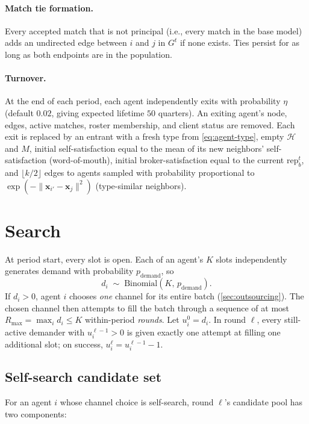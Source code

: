 \documentclass[11pt]{article}
\providecommand{\cref}[1]{\ref{#1}}
\newcommand{\x}{\mathbf{x}}
\newcommand{\Hist}{\mathcal{H}}
\newcommand{\rep}{\mathrm{rep}}
\begin{document}
\paragraph{Match tie formation.} Every accepted match that is not principal (i.e., every match in the base model) adds an undirected edge between $i$ and $j$ in $G^t$ if none exists. Ties persist for as long as both endpoints are in the population.

\paragraph{Turnover.} At the end of each period, each agent independently exits with probability $\eta$ (default $0.02$, giving expected lifetime $50$ quarters). An exiting agent's node, edges, active matches, roster membership, and client status are removed. Each exit is replaced by an entrant with a fresh type from \cref{eq:agent-type}, empty $\Hist$ and $M$, initial self-satisfaction equal to the mean of its new neighbors' self-satisfaction (word-of-mouth), initial broker-satisfaction equal to the current $\rep_b^t$, and $\lfloor k/2\rfloor$ edges to agents sampled with probability proportional to $\exp(-\|\x_{i'}-\x_j\|^2)$ (type-similar neighbors).

\section{Search}\label{sec:search}

At period start, every slot is open. Each of an agent's $K$ slots independently generates demand with probability $p_{\text{demand}}$, so
\begin{equation}
d_i \;\sim\; \mathrm{Binomial}(K,\,p_{\text{demand}}).
\label{eq:demand}
\end{equation}
If $d_i>0$, agent $i$ chooses \emph{one} channel for its entire batch (\cref{sec:outsourcing}). The chosen channel then attempts to fill the batch through a sequence of at most $R_{\max}=\max_i d_i \le K$ within-period \emph{rounds}. Let $u_i^0 = d_i$. In round $\ell$, every still-active demander with $u_i^{\ell-1}>0$ is given exactly one attempt at filling one additional slot; on success, $u_i^\ell = u_i^{\ell-1}-1$.

\subsection{Self-search candidate set}\label{sec:selfsearch}

For an agent $i$ whose channel choice is self-search, round $\ell$'s candidate pool has two components:
\end{document}
